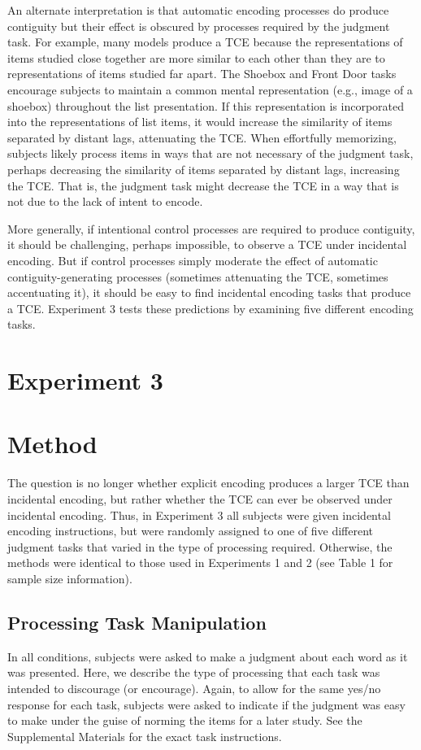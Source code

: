 \documentclass[man,natbib,floatsintext]{apa6} %
\begin{document}
An alternate interpretation is that automatic encoding processes do produce contiguity but their effect is obscured by processes required by the judgment task. For example, many models produce a TCE because the representations of items studied close together are more similar to each other than they are to representations of items studied far apart. The Shoebox and Front Door tasks encourage subjects to maintain a common mental representation (e.g., image of a shoebox) throughout the list presentation. If this representation is incorporated into the representations of list items, it would increase the similarity of items separated by distant lags, attenuating the TCE. When effortfully memorizing, subjects likely process items in ways that are not necessary of the judgment task, perhaps decreasing the similarity of items separated by distant lags, increasing the TCE. That is, the judgment task might decrease the TCE in a way that is not due to the lack of intent to encode.

More generally, if intentional control processes are required to produce contiguity, it should be challenging, perhaps impossible, to observe a TCE under incidental encoding. But if control processes simply moderate the effect of automatic contiguity-generating processes (sometimes attenuating the TCE, sometimes accentuating it), it should be easy to find incidental encoding tasks that produce a TCE. Experiment 3 tests these predictions by examining five different encoding tasks.

\section{Experiment 3}
\section{Method}
The question is no longer whether explicit encoding produces a larger TCE than incidental encoding, but rather whether the TCE can ever be observed under incidental encoding. Thus, in Experiment 3 all subjects were given incidental encoding instructions, but were randomly assigned to one of five different judgment tasks that varied in the type of processing required. Otherwise, the methods were identical to those used in Experiments 1 and 2 (see Table 1 for sample size information).

\subsection{Processing Task Manipulation}
In all conditions, subjects were asked to make a judgment about each word as it was presented. Here, we describe the type of processing that each task was intended to discourage (or encourage). Again, to allow for the same yes/no response for each task, subjects were asked to indicate if the judgment was easy to make under the guise of norming the items for a later study. See the Supplemental Materials for the exact task instructions.
\end{document}
